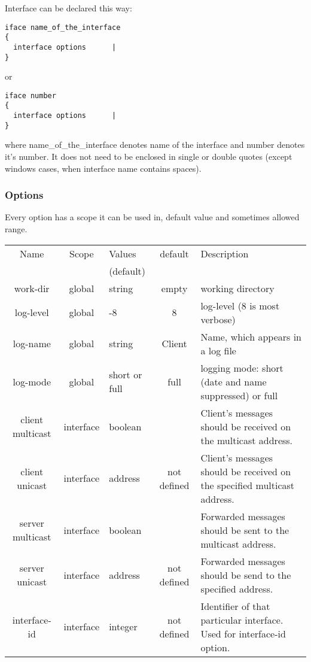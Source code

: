 Interface can be declared this way:
\begin{verbatim}
iface name_of_the_interface
{
  interface options      |
}
\end{verbatim}

or 

\begin{verbatim}
iface number 
{
  interface options      |
}
\end{verbatim}

where name\_of\_the\_interface denotes name of the interface and
number denotes it's number. It does not need to be enclosed in
single or double quotes (except windows cases, when interface name
contains spaces).

\subsubsection{Options}

Every option has a scope it can be used in, default value and
sometimes allowed range.

\begin{tabular}{|c|c|>{\centering}p{1.7cm}<{}|c|p{6cm}|}
\hline
Name             & Scope   & Values      & default    & Description \\
                 &         & (default)   &  & \\
\hline
work-dir         & global  & string      & empty      & working directory \\
log-level        & global  & 1-8         & 8          & log-level (8 is most verbose) \\
log-name         & global  & string      & Client     & Name, which appears in a log file\\
log-mode         & global  &short or full& full       & logging mode: short (date and name suppressed) or full \\

client multicast &interface& boolean     &            & Client's messages should be received on the multicast address.\\
client unicast   &interface& address     &not defined & Client's messages should be received on the specified multicast address. \\
server multicast &interface& boolean     &            & Forwarded messages should be sent to the multicast address. \\
server unicast   &interface& address     &not defined & Forwarded messages should be send to the specified address. \\
interface-id     &interface& integer     &not defined & Identifier of that particular interface. Used for interface-id option. \\
\hline
\end{tabular}

